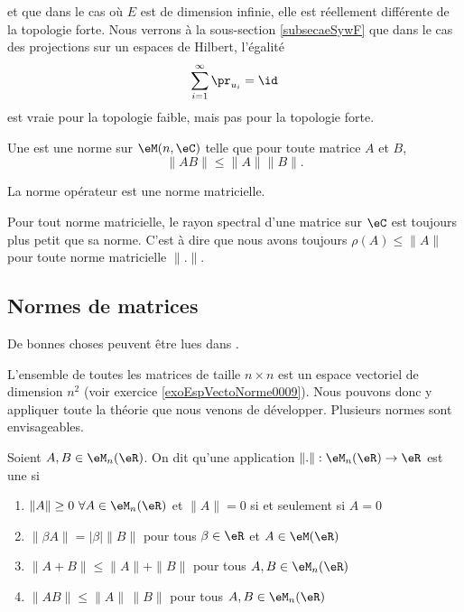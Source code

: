 et que dans le cas où \( E\) est de dimension infinie, elle est réellement différente de la topologie forte. Nous verrons à la sous-section \ref{subsecaeSywF} que dans le cas des projections sur un espaces de Hilbert, l'égalité
\begin{equation}
    \sum_{i=1}^{\infty}\pr_{u_i}=\id
\end{equation}
est vraie pour la topologie faible, mais pas pour la topologie forte.

\begin{definition}
    Une  est une norme sur \( \eM(n,\eC)\) telle que pour toute matrice \( A\) et \( B\), 
    \begin{equation}
        \| AB \|\leq \| A \|\| B \|.
    \end{equation}
\end{definition}
La norme opérateur est une norme matricielle.

\begin{proposition}
    Pour tout norme matricielle, le rayon spectral d'une matrice sur \( \eC\) est toujours plus petit que sa norme. C'est à dire que nous avons toujours \( \rho(A)\leq \| A \|\) pour toute norme matricielle \( \| . \|\).
\end{proposition}

\subsection{Normes de matrices}
De bonnes choses peuvent être lues dans \cite{BrunelleMatricielle}.

L'ensemble de toutes les matrices de taille \( n\times n\) est un espace vectoriel de dimension \( n^2\) (voir exercice \ref{exoEspVectoNorme0009}). Nous pouvons donc y appliquer toute la théorie que nous venons de développer. Plusieurs normes sont envisageables.

\begin{definition}
    Soient $A,B\in \eM_n(\eR)$. On dit qu'une application $\| . \|: \eM_n(\eR)\to\eR$ est une  si
\begin{enumerate}
\item $\| A \|\geq 0\ \forall A\in \eM_n(\eR)$ et $\| A \|=0$ si et seulement si $A=0$
\item $\| \beta A\|=| \beta |\|B\|$ pour tous $\beta\in\eR$ et \( A\in\eM(\eR)\)
\item $\|A+B\|\leq\|A\|+\|B\|$ pour tous $A,B\in \eM_n(\eR)$
\item $\|AB\|\leq\|A\|\, \|B\|$ pour tous $A,B\in \eM_n(\eR)$
\end{enumerate}
\end{definition}

